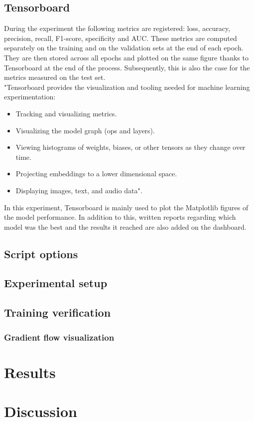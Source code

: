 \subsection{Tensorboard}
During the experiment the following metrics are registered: loss, accuracy, precision, recall, F1-score, specificity and AUC. These metrics are computed separately on the training and on the validation sets at the end of each epoch. They are then stored across all epochs and plotted on the same figure thanks to Tensorboard at the end of the process. Subsequently, this is also the case for the metrics measured on the test set.\\
"Tensorboard provides the visualization and tooling needed for machine learning experimentation:
\begin{itemize}
\item Tracking and visualizing metrics.
\item Visualizing the model graph (ops and layers).
\item Viewing histograms of weights, biases, or other tensors as they change over time.
\item Projecting embeddings to a lower dimensional space.
\item Displaying images, text, and audio data"\cite{39}.
\end{itemize}
In this experiment, Tensorboard is mainly used to plot the Matplotlib figures of the model performance. In addition to this, written reports regarding which model was the best and the results it reached are also added on the dashboard.
\label{paper_tensorboard}
\subsection{Script options}
\subsection{Experimental setup}
\subsection{Training verification}
\subsubsection{Gradient flow visualization}

\section{Results}

\section{Discussion}